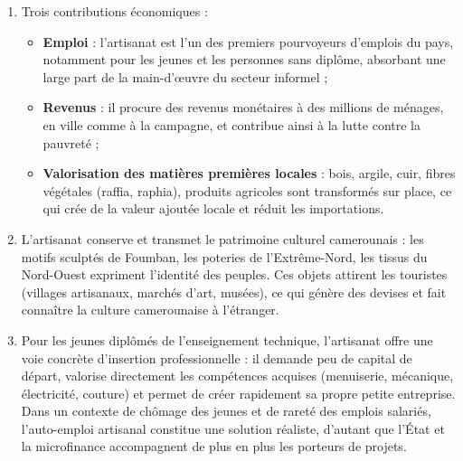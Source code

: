 \documentclass[11pt]{article}
\newcommand{\cle}[1]{{\popxbold\color{popdark}#1}}
\begin{document}
\begin{corrige}
\begin{enumerate}
\item Trois contributions économiques :
\begin{itemize}
\item \textbf{Emploi} : l'artisanat est l'un des premiers pourvoyeurs d'emplois du pays, notamment pour les jeunes et les personnes sans diplôme, absorbant une large part de la main-d'œuvre du secteur informel ;
\item \textbf{Revenus} : il procure des revenus monétaires à des millions de ménages, en ville comme à la campagne, et contribue ainsi à la lutte contre la pauvreté ;
\item \textbf{Valorisation des matières premières locales} : bois, argile, cuir, fibres végétales (raffia, raphia), produits agricoles sont transformés sur place, ce qui crée de la valeur ajoutée locale et réduit les importations.
\end{itemize}
\item L'artisanat conserve et transmet le patrimoine culturel camerounais : les motifs sculptés de Foumban, les poteries de l'Extrême-Nord, les tissus du Nord-Ouest expriment l'identité des peuples. Ces objets attirent les touristes (villages artisanaux, marchés d'art, musées), ce qui génère des devises et fait connaître la culture camerounaise à l'étranger.
\item Pour les jeunes diplômés de l'enseignement technique, l'artisanat offre une voie concrète d'\cle{insertion professionnelle} : il demande peu de capital de départ, valorise directement les compétences acquises (menuiserie, mécanique, électricité, couture) et permet de créer rapidement sa propre petite entreprise. Dans un contexte de chômage des jeunes et de rareté des emplois salariés, l'auto-emploi artisanal constitue une solution réaliste, d'autant que l'État et la microfinance accompagnent de plus en plus les porteurs de projets.
\end{enumerate}
\end{corrige}
\end{document}
